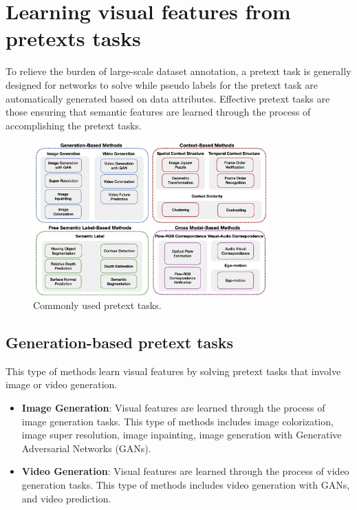 \section{Learning visual features from pretexts tasks}
To relieve the burden of large-scale dataset annotation, a pretext task is generally
designed for networks to solve while pseudo labels for the pretext task are
automatically generated based on data attributes. Effective pretext tasks are
those ensuring that semantic features are learned through the process of accomplishing
the pretext tasks.

\begin{figure}[!ht]
      \centering
      \includegraphics[width=0.8\textwidth]{img/SSL/commonlyPreText.png}
      \caption{Commonly used pretext tasks.}
      \label{fig:SSL}
\end{figure}

\subsection{Generation-based pretext tasks}
This type of methods learn visual features by solving pretext tasks that involve
image or video generation.
\begin{itemize}
      \item \textbf{Image Generation}: Visual features are learned through the process
            of image generation tasks. This type of methods includes image colorization,
            image super resolution, image inpainting, image generation with Generative
            Adversarial Networks (GANs).
      \item \textbf{Video Generation}: Visual features are learned through the process
            of video generation tasks. This type of methods includes video generation
            with GANs, and video prediction.
\end{itemize}

